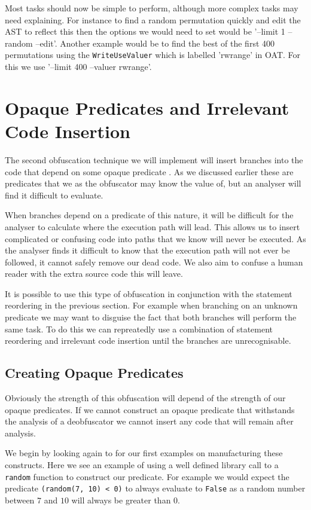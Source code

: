 \documentclass[twoside,a4paper]{report}
\begin{document}
Most tasks should now be simple to perform, although more complex tasks may need explaining. For instance to find a random permutation quickly and edit the
AST to reflect this then the options we would need to set would be '--limit 1 --random --edit'. Another example would be to find the best of the first 400
permutations using the \texttt{WriteUseValuer} which is labelled 'rwrange' in OAT. For this we use '--limit 400 --valuer rwrange'.

\section{Opaque Predicates and Irrelevant Code Insertion}

The second obfuscation technique we will implement will insert branches into the code that depend on some opaque predicate \cite{taxobftrans}.
As we discussed earlier these are predicates that we as the obfuscator may know the value of, but an analyser will find it difficult to evaluate.

When branches depend on a predicate of this nature, it will be difficult for the analyser to calculate where the execution path will lead. This allows
us to insert complicated or confusing code into paths that we know will never be executed. As the analyser finds it difficult to know that the execution
path will not ever be followed, it cannot safely remove our dead code. We also aim to confuse a human reader with the extra source code this will leave.

It is possible to use this type of obfuscation in conjunction with the statement reordering in the previous section. For example when branching on
an unknown predicate we may want to disguise the fact that both branches will perform the same task. To do this we can repreatedly use a combination
of statement reordering and irrelevant code insertion until the branches are unrecognisable.

\subsection{Creating Opaque Predicates}

Obviously the strength of this obfuscation will depend of the strength of our opaque predicates. If we cannot construct an opaque predicate that withstands
the analysis of a deobfuscator we cannot insert any code that will remain after analysis.

We begin by looking again to \cite{taxobftrans} for our first examples on manufacturing these constructs. Here we see an example of using a well defined
library call to a \texttt{random} function to construct our predicate. For example we would expect the predicate \texttt{(random(7, 10) < 0)} to always
evaluate to \texttt{False} as a random number between $7$ and $10$ will always be greater than $0$.
\end{document}
